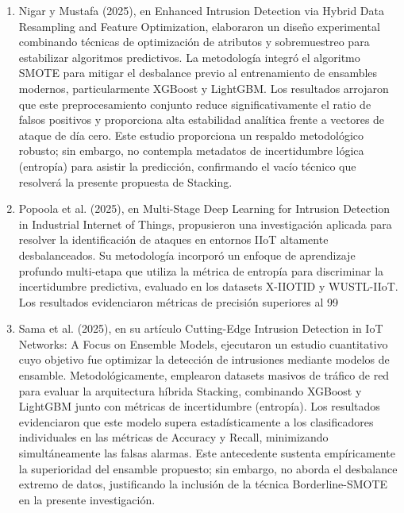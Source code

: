 \begin{enumerate}
\item Nigar y Mustafa (2025), en Enhanced Intrusion Detection via Hybrid Data Resampling and Feature Optimization, elaboraron un diseño experimental combinando técnicas de optimización de atributos y sobremuestreo para estabilizar algoritmos predictivos. La metodología integró el algoritmo SMOTE para mitigar el desbalance previo al entrenamiento de ensambles modernos, particularmente XGBoost y LightGBM. Los resultados arrojaron que este preprocesamiento conjunto reduce significativamente el ratio de falsos positivos y proporciona alta estabilidad analítica frente a vectores de ataque de día cero. Este estudio proporciona un respaldo metodológico robusto; sin embargo, no contempla metadatos de incertidumbre lógica (entropía) para asistir la predicción, confirmando el vacío técnico que resolverá la presente propuesta de Stacking.

\item Popoola et al. (2025), en Multi-Stage Deep Learning for Intrusion Detection in Industrial Internet of Things, propusieron una investigación aplicada para resolver la identificación de ataques en entornos IIoT altamente desbalanceados. Su metodología incorporó un enfoque de aprendizaje profundo multi-etapa que utiliza la métrica de entropía para discriminar la incertidumbre predictiva, evaluado en los datasets X-IIOTID y WUSTL-IIoT. Los resultados evidenciaron métricas de precisión superiores al 99%

\item Sama et al. (2025), en su artículo Cutting-Edge Intrusion Detection in IoT Networks: A Focus on Ensemble Models, ejecutaron un estudio cuantitativo cuyo objetivo fue optimizar la detección de intrusiones mediante modelos de ensamble. Metodológicamente, emplearon datasets masivos de tráfico de red para evaluar la arquitectura híbrida Stacking, combinando XGBoost y LightGBM junto con métricas de incertidumbre (entropía). Los resultados evidenciaron que este modelo supera estadísticamente a los clasificadores individuales en las métricas de Accuracy y Recall, minimizando simultáneamente las falsas alarmas. Este antecedente sustenta empíricamente la superioridad del ensamble propuesto; sin embargo, no aborda el desbalance extremo de datos, justificando la inclusión de la técnica Borderline-SMOTE en la presente investigación.


\end{enumerate}
